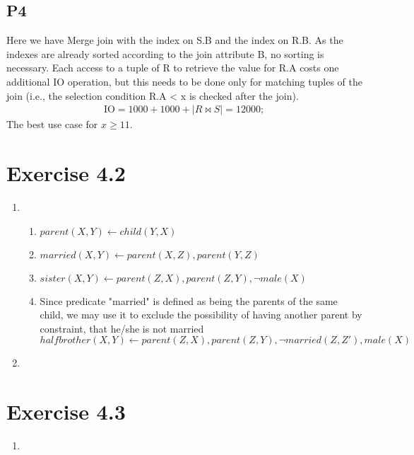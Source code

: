 \documentclass[10pt]{article}
\begin{document}
  \subsection*{P4}
  Here we have Merge join with the index on S.B and the index on R.B. As the indexes
  are already sorted according to the join attribute B, no sorting is necessary.
  Each access to a tuple of R to retrieve the value for R.A costs one additional
  IO operation, but this needs to be done only for matching tuples of the join
  (i.e., the selection condition R.A < x is checked after the join).\\
  \begin{align*}
    \text{IO} = 1000 + 1000 + |R \bowtie S| = 12000;
  \end{align*}
  The best use case for $x \geq 11$.
  
  \section*{Exercise 4.2}
  \begin{enumerate}[label=\arabic*.]
    \item
    	\begin{enumerate}[label=\arabic*.]
          \item
            $parent(X,Y) \leftarrow child(Y,X)$
          \item
          	$married(X,Y) \leftarrow parent(X,Z),parent(Y,Z)$
          \item
          	$sister(X,Y) \leftarrow parent(Z,X),parent(Z,Y),\neg male(X)$
          \item
          	Since predicate "married" is defined as being the parents of the same child, we may use it to exclude the possibility of having another parent by constraint, that he/she is not married\\
            $halfbrother(X,Y) \leftarrow parent(Z,X),parent(Z,Y),\neg married(Z, Z'), male(X)$
  		\end{enumerate}
    \item
    	
  \end{enumerate}
  
  \section*{Exercise 4.3}
   \begin{enumerate}[label=\arabic*.] 
      \item 
  \end{enumerate}
\end{document}
